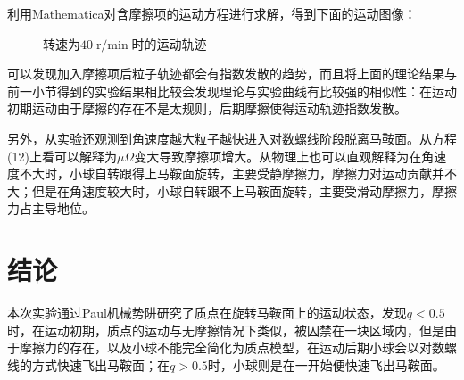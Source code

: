 \documentclass{WHUReport}
\begin{document}
\begin{multicols}{2}
	利用Mathematica对含摩擦项的运动方程进行求解，得到下面的运动图像：
	\begin{figure}[H]
		\centering  %
		\subfigbottomskip=2pt %
		\subfigcapskip=-5pt %
		\caption{转速为$40\operatorname{r/min}$时的运动轨迹}
	\end{figure}
	
	
	可以发现加入摩擦项后粒子轨迹都会有指数发散的趋势，而且将上面的理论结果与前一小节得到的实验结果相比较会发现理论与实验曲线有比较强的相似性：在运动初期运动由于摩擦的存在不是太规则，后期摩擦使得运动轨迹指数发散。
	
	另外，从实验还观测到角速度越大粒子越快进入对数螺线阶段脱离马鞍面。从方程(12)上看可以解释为$\mu\Omega$变大导致摩擦项增大。从物理上也可以直观解释为在角速度不大时，小球自转跟得上马鞍面旋转，主要受静摩擦力，摩擦力对运动贡献并不大；但是在角速度较大时，小球自转跟不上马鞍面旋转，主要受滑动摩擦力，摩擦力占主导地位。
	\section{结\quad 论}
	本次实验通过Paul机械势阱研究了质点在旋转马鞍面上的运动状态，发现$q<0.5$时，在运动初期，质点的运动与无摩擦情况下类似，被囚禁在一块区域内，但是由于摩擦力的存在，以及小球不能完全简化为质点模型，在运动后期小球会以对数螺线的方式快速飞出马鞍面；在$q>0.5$时，小球则是在一开始便快速飞出马鞍面。
	

\end{multicols}
\end{document}
